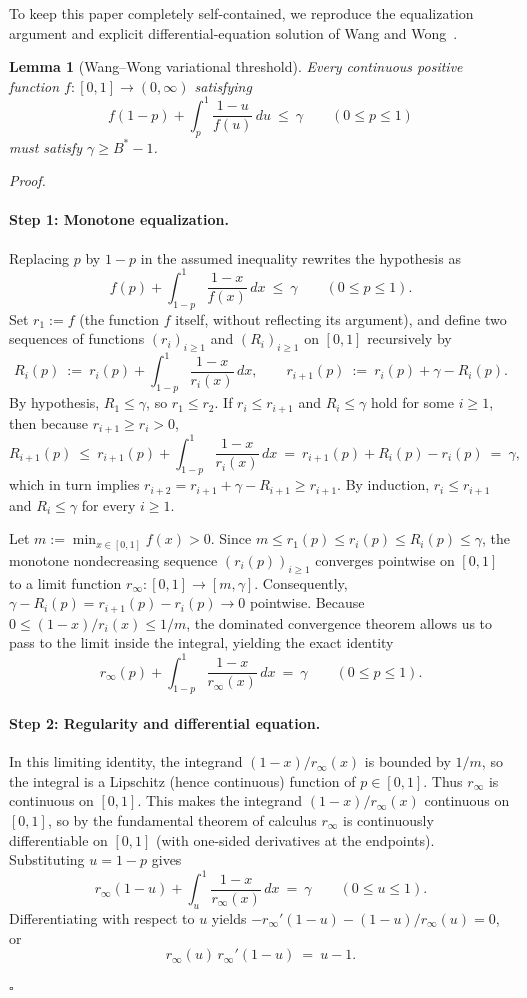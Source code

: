 \documentclass[11pt,letterpaper]{article}
\newtheorem{lemma}{Lemma}[section]
\newenvironment{proof}[1][Proof]{\par\smallskip\noindent\textit{#1.}\ \ignorespaces}{\hfill$\square$\par\medskip}
\begin{document}
To keep this paper completely self-contained, we reproduce the equalization argument and explicit differential-equation solution of Wang and Wong~\cite[Section~4.1]{ww}.

\begin{lemma}[Wang--Wong variational threshold]\label{lem:ww-threshold}
Every continuous positive function $f:[0,1]\to(0,\infty)$ satisfying
\[
  f(1-p) + \int_p^1 \frac{1-u}{f(u)}\,du\ \le\ \gamma \qquad(0\le p\le 1)
\]
must satisfy $\gamma \ge B^*-1$.
\end{lemma}

\begin{proof}
\paragraph{Step 1: Monotone equalization.}
Replacing $p$ by $1-p$ in the assumed inequality rewrites the hypothesis as
\[
  f(p) + \int_{1-p}^1 \frac{1-x}{f(x)}\,dx\ \le\ \gamma \qquad(0\le p\le 1).
\]
Set $r_1 := f$ (the function $f$ itself, without reflecting its argument), and define two sequences of functions $(r_i)_{i\ge 1}$ and $(R_i)_{i\ge 1}$ on $[0,1]$ recursively by
\[
  R_i(p)\ :=\ r_i(p) + \int_{1-p}^1 \frac{1-x}{r_i(x)}\,dx,\qquad
  r_{i+1}(p)\ :=\ r_i(p) + \gamma - R_i(p).
\]
By hypothesis, $R_1\le\gamma$, so $r_1\le r_2$. If $r_i\le r_{i+1}$ and $R_i\le\gamma$ hold for some $i\ge 1$, then because $r_{i+1}\ge r_i > 0$,
\[
  R_{i+1}(p)\ \le\ r_{i+1}(p) + \int_{1-p}^1 \frac{1-x}{r_i(x)}\,dx
  \ =\ r_{i+1}(p) + R_i(p) - r_i(p)\ =\ \gamma,
\]
which in turn implies $r_{i+2} = r_{i+1} + \gamma - R_{i+1} \ge r_{i+1}$. By induction, $r_i\le r_{i+1}$ and $R_i\le\gamma$ for every $i\ge 1$.

Let $m := \min_{x\in[0,1]} f(x) > 0$. Since $m \le r_1(p) \le r_i(p) \le R_i(p) \le \gamma$, the monotone nondecreasing sequence $(r_i(p))_{i\ge 1}$ converges pointwise on $[0,1]$ to a limit function $r_\infty:[0,1]\to[m,\gamma]$. Consequently, $\gamma - R_i(p) = r_{i+1}(p) - r_i(p) \to 0$ pointwise. Because $0 \le (1-x)/r_i(x) \le 1/m$, the dominated convergence theorem allows us to pass to the limit inside the integral, yielding the exact identity
\[
  r_\infty(p) + \int_{1-p}^1 \frac{1-x}{r_\infty(x)}\,dx\ =\ \gamma \qquad(0\le p\le 1).
\]

\paragraph{Step 2: Regularity and differential equation.}
In this limiting identity, the integrand $(1-x)/r_\infty(x)$ is bounded by $1/m$, so the integral is a Lipschitz (hence continuous) function of $p\in[0,1]$. Thus $r_\infty$ is continuous on $[0,1]$. This makes the integrand $(1-x)/r_\infty(x)$ continuous on $[0,1]$, so by the fundamental theorem of calculus $r_\infty$ is continuously differentiable on $[0,1]$ (with one-sided derivatives at the endpoints). Substituting $u=1-p$ gives
\[
  r_\infty(1-u) + \int_u^1 \frac{1-x}{r_\infty(x)}\,dx\ =\ \gamma \qquad(0\le u\le 1).
\]
Differentiating with respect to $u$ yields $-r_\infty'(1-u) - (1-u)/r_\infty(u) = 0$, or
\[
  r_\infty(u)\,r_\infty'(1-u)\ =\ u - 1 .
\]


\end{proof}
\end{document}
